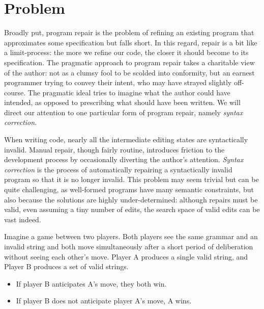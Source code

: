 \documentclass[sigplan,screen]{acmart}
\begin{document}
\section{Problem}


Broadly put, program repair is the problem of refining an existing program that approximates some specification but falls short. In this regard, repair is a bit like a limit-process: the more we refine our code, the closer it should become to its specification. The pragmatic approach to program repair takes a charitable view of the author: not as a clumsy fool to be scolded into conformity, but an earnest programmer trying to convey their intent, who may have strayed slightly off-course. The pragmatic ideal tries to imagine what the author could have intended, as opposed to prescribing what should have been written. We will direct our attention to one particular form of program repair, namely \emph{syntax correction}.

When writing code, nearly all the intermediate editing states are syntactically invalid. Manual repair, though fairly routine, introduces friction to the development process by occasionally diverting the author's attention. \textit{Syntax correction} is the process of automatically repairing a syntactically invalid program so that it is no longer invalid. This problem may seem trivial but can be quite challenging, as well-formed programs have many semantic constraints, but also because the solutions are highly under-determined: although repairs must be valid, even assuming a tiny number of edits, the search space of valid edits can be vast indeed.

Imagine a game between two players. Both players see the same grammar and an invalid string and both move simultaneously after a short period of deliberation without seeing each other's move. Player A produces a single valid string, and Player B produces a set of valid strings.

\begin{itemize}
  \item If player B anticipates A's move, they both win.
  \item If player B does not anticipate player A's move, A wins.
\end{itemize}
\end{document}
